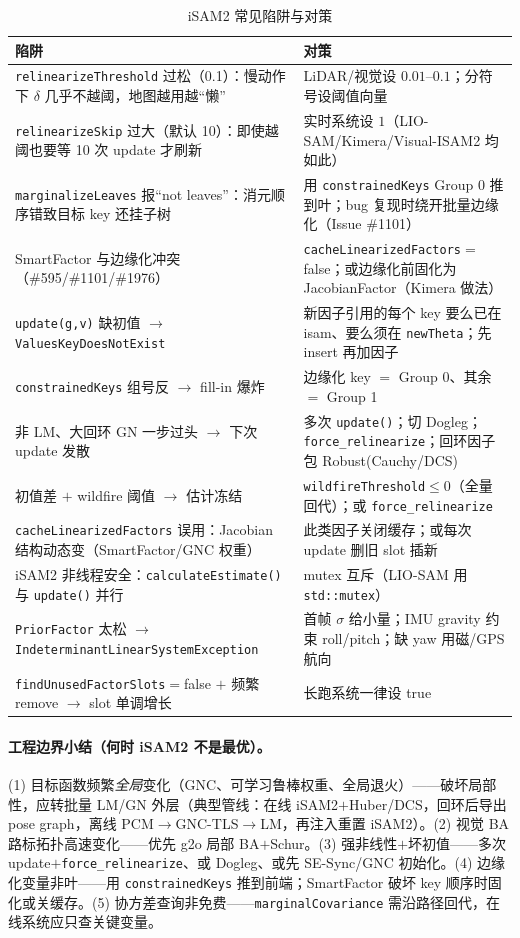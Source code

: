 \begin{table}[H]\centering\small
\caption{iSAM2 常见陷阱与对策}
\label{tab:isam-pitfalls}
\begin{tabular}{p{}p{}}
\toprule
陷阱 & 对策 \\
\midrule
\texttt{relinearizeThreshold} 过松（0.1）：慢动作下 $\delta$ 几乎不越阈，地图越用越“懒” & LiDAR/视觉设 $0.01$--$0.1$；分符号设阈值向量 \\
\texttt{relinearizeSkip} 过大（默认 10）：即使越阈也要等 10 次 update 才刷新 & 实时系统设 $1$（LIO-SAM/Kimera/Visual-ISAM2 均如此） \\
\texttt{marginalizeLeaves} 报“not leaves”：消元顺序错致目标 key 还挂子树 & 用 \texttt{constrainedKeys} Group 0 推到叶；bug 复现时绕开批量边缘化（Issue \#1101） \\
SmartFactor 与边缘化冲突（\#595/\#1101/\#1976） & \texttt{cacheLinearizedFactors}$=$false；或边缘化前固化为 JacobianFactor（Kimera 做法） \\
\texttt{update(g,v)} 缺初值 $\to$ \texttt{ValuesKeyDoesNotExist} & 新因子引用的每个 key 要么已在 isam、要么须在 \texttt{newTheta}；先 insert 再加因子 \\
\texttt{constrainedKeys} 组号反 $\to$ fill-in 爆炸 & 边缘化 key $=$ Group 0、其余 $=$ Group 1 \\
非 LM、大回环 GN 一步过头 $\to$ 下次 update 发散 & 多次 \texttt{update()}；切 Dogleg；\texttt{force\_relinearize}；回环因子包 Robust(Cauchy/DCS) \\
初值差 $+$ wildfire 阈值 $\to$ 估计冻结 & \texttt{wildfireThreshold}$\le 0$（全量回代）；或 \texttt{force\_relinearize} \\
\texttt{cacheLinearizedFactors} 误用：Jacobian 结构动态变（SmartFactor/GNC 权重） & 此类因子关闭缓存；或每次 update 删旧 slot 插新 \\
iSAM2 非线程安全：\texttt{calculateEstimate()} 与 \texttt{update()} 并行 & mutex 互斥（LIO-SAM 用 \texttt{std::mutex}） \\
\texttt{PriorFactor} 太松 $\to$ \texttt{IndeterminantLinearSystemException} & 首帧 $\sigma$ 给小量；IMU gravity 约束 roll/pitch；缺 yaw 用磁/GPS 航向 \\
\texttt{findUnusedFactorSlots}$=$false $+$ 频繁 remove $\to$ slot 单调增长 & 长跑系统一律设 true \\
\bottomrule
\end{tabular}
\end{table}

\paragraph{工程边界小结（何时 iSAM2 不是最优）。}
(1) 目标函数频繁\emph{全局}变化（GNC、可学习鲁棒权重、全局退火）——破坏局部性，应转批量 LM/GN 外层（典型管线：在线 iSAM2$+$Huber/DCS，回环后导出 pose graph，离线 PCM$\to$GNC-TLS$\to$LM，再注入重置 iSAM2）。(2) 视觉 BA 路标拓扑高速变化——优先 g2o 局部 BA$+$Schur。(3) 强非线性$+$坏初值——多次 update$+$\texttt{force\_relinearize}、或 Dogleg、或先 SE-Sync/GNC 初始化。(4) 边缘化变量非叶——用 \texttt{constrainedKeys} 推到前端；SmartFactor 破坏 key 顺序时固化或关缓存。(5) 协方差查询非免费——\texttt{marginalCovariance} 需沿路径回代，在线系统应只查关键变量。

